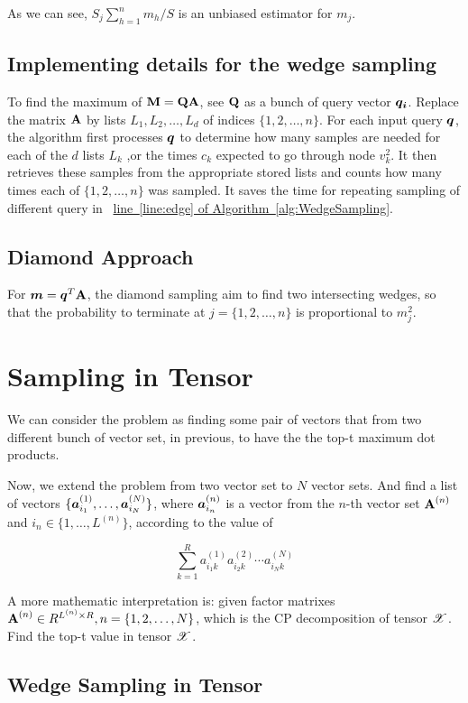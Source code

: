 \documentclass{article}
\newcommand{\Sca}[3]{{#1}^{(#2)}_{i_#2#3}}%
\newcommand{\T}[1]{\boldsymbol{\mathscr{\MakeUppercase{#1}}}}%
\newcommand{\V}[1]{{\bm{{\MakeLowercase{#1}}}}}%
\newcommand{\VnC}[3]{\V{#1}^{(#2)}_{#3}}%
\newcommand{\M}[1]{{\bm{\mathbf{\MakeUppercase{#1}}}}}%
\newcommand{\AlgLine}[2]{\hyperref[alg:#1]{line~\ref*{line:#2} of Algorithm~\ref*{alg:#1}}}
\begin{document}
As we can see, $S_j\sum_{h=1}^{n}m_h/S$ is an unbiased estimator for $m_j$.

\subsection{Implementing details for the wedge sampling}

To find the maximum of $\M{m} = \M{q}\M{A}$, see $\M{q}$ as a bunch of query vector $\V{q_i}$. Replace the matrix $\M{A}$ by lists $L_1,L_2,\ldots,L_d$ of indices $\{1,2,\ldots,n\}$. For each input query $\V{q}$, the algorithm first processes $\V{q}$ to determine how many samples are needed for each of the $d$ lists $L_k$ ,or the times $c_k$ expected to go through node $v_k^2$. It then retrieves these samples from the appropriate stored lists and counts how many times each of $\{1,2,\ldots,n\}$ was sampled. It saves the time for repeating sampling of different query in ~\AlgLine{WedgeSampling}{edge}.

\subsection{Diamond Approach}

For $\V{m} = \V{q}^T\M{A}$, the diamond sampling aim to find two intersecting wedges, so that the probability to terminate at $j = \{1,2,\ldots,n\}$ is proportional to $m_j^2$.

\section{Sampling in Tensor}

We can consider the problem as finding some pair of vectors that from two different bunch of vector set, in previous, to have the the top-t maximum dot products.

Now, we extend the problem from two vector set to $N$ vector sets. And find a list of vectors $\{\VnC{A}{1}{i_1},\ldots,\VnC{A}{N}{i_N}\}$, where $\VnC{A}{n}{i_n}$ is a vector from the $n$-th vector set $\M{A}^{(n)}$ and $i_n \in \{1,\ldots,L^{(n)}\}$, according to the value of

\[\sum_{k=1}^{R}\Sca{a}{1}{k}\Sca{a}{2}{k}\cdots\Sca{a}{N}{k}\]

A more mathematic interpretation is: given factor matrixes $\M{A}^{(n)}\in R^{L^{(n)}\times R},n=\{1,2,\ldots,N\}$, which is the CP decomposition of tensor $\T{X}$. Find the top-t value in tensor $\T{X}$.
\subsection{Wedge Sampling in Tensor}
\end{document}
